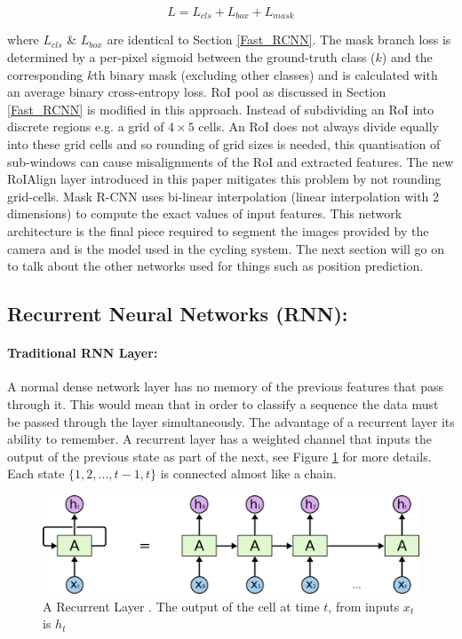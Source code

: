 \documentclass[11pt,twoside]{report}
\begin{document}
\begin{equation}
\label{maskrcnnloss}
L = L_{cls} + L_{box} + L_{mask}
\end{equation}

where $L_{cls}$ \& $L_{box}$ are identical to Section \ref{Fast_RCNN}. The mask branch loss is determined by a per-pixel sigmoid between the ground-truth class ($k$) and the corresponding $k$th binary mask (excluding other classes) and is calculated with an average binary cross-entropy loss.
\newline \newline
RoI pool as discussed in Section \ref{Fast_RCNN} is modified in this approach. Instead of subdividing an RoI into discrete regions e.g. a grid of $4 \times 5$ cells. An RoI does not always divide equally into these grid cells and so rounding of grid sizes is needed, this quantisation of sub-windows can cause misalignments of the RoI and extracted features. The new RoIAlign layer introduced in this paper mitigates this problem by not rounding grid-cells. Mask R-CNN uses bi-linear interpolation (linear interpolation with 2 dimensions) to compute the exact values of input features.
\newline \newline
This network architecture is the final piece required to segment the images provided by the camera and is the model used in the cycling system. The next section will go on to talk about the other networks used for things such as position prediction.
\subsection{Recurrent Neural Networks (RNN):}

\paragraph{Traditional RNN Layer:}A normal dense network layer has no memory of the previous features that pass through it. This would mean that in order to classify a sequence the data must be passed through the layer simultaneously. The advantage of a recurrent layer its ability to remember. A recurrent layer has a weighted channel that inputs the output of the previous state as part of the next, see Figure \ref{rnn_unrolled} for more details. Each state $ \{ 1,2,...,t-1,t \}$ is connected almost like a chain.

\noindent \begin{figure}[h!]
	\includegraphics[width = 1.0\hsize]{./figures/RNN-unrolled.png}
	\caption{A Recurrent Layer \cite{Christopher_Olah_Blog} . The output of the cell at time $t$, from inputs $x_{t}$ is $h_{t}$}
	\label{rnn_unrolled}
\end{figure}
\end{document}
